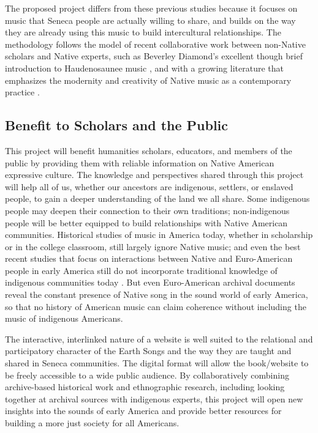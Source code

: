 \documentclass{neh}
\begin{document}
The proposed project differs from these previous studies because it focuses on
music that Seneca people are actually willing to share, and builds on the way
they are already using this music to build intercultural relationships.
The methodology follows the model of recent collaborative work between
non-Native scholars and Native experts, such as Beverley Diamond's excellent
though brief introduction to Haudenosaunee music 
\Autocite{Diamond:NativeAmericanNortheast},
and with a growing literature that emphasizes the modernity and creativity of
Native music as a contemporary practice
\Autocites
{Browner:FirstNations}
{Browner:Heartbeat}
{LevineRobinson:MusicModernity}.

\subsection{Benefit to Scholars and the Public}

This project will benefit humanities scholars, educators, and members of the
public by providing them with reliable information on Native American
expressive culture.
The knowledge and perspectives shared through this project will help all of
us, whether our ancestors are indigenous, settlers, or enslaved people, to
gain a deeper understanding of the land we all share.
Some indigenous people may deepen their connection to their own traditions;
non-indigenous people will be better equipped to build relationships with
Native American communities.
Historical studies of music in America today, whether in scholarship or in the
college classroom, still largely ignore Native music; and even the best recent
studies that focus on interactions between Native and Euro-American people in
early America still do not incorporate traditional knowledge of indigenous
communities today
\Autocites{Goodman:IndianPsalmody}{Eyerly:Moravian}.
But even Euro-American archival documents reveal the constant presence of
Native song in the sound world of early America, so that no history of
American music can claim coherence without including the music of indigenous
Americans.

The interactive, interlinked nature of a website is well suited to the
relational and participatory character of the Earth Songs and the way they are
taught and shared in Seneca communities.
The digital format will allow the book/website to be freely 
accessible to a wide public audience.
By collaboratively combining archive-based historical work and ethnographic
research, including looking together at archival sources with indigenous
experts, this project will open new insights into the sounds of early America
and provide better resources for building a more just society for all
Americans.
\end{document}
